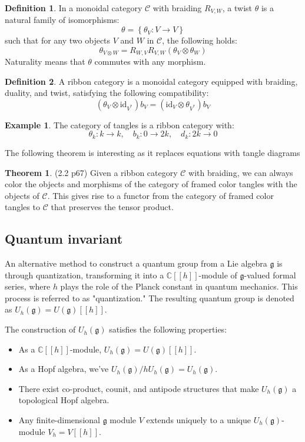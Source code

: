 \documentclass[11pt]{article}
\theoremstyle{definition}
\newtheorem{theo}{Theorem}[section]
\newtheorem{ex}{Example}[section]
\newtheorem{Def}{Definition}[section]
\begin{document}
\begin{Def} In a monoidal category \(\mathcal{C}\) with braiding \(R_{V,W}\), a twist \(\theta\) is a natural family of isomorphisms:
\[\theta=\left\lbrace\theta_V : V\to V \right\rbrace\]
such that for any two objects \(V\) and \(W\) in \(\mathcal{C}\), the following holds:
\[\theta_{V\otimes W}=R_{W,V}R_{V,W}(\theta_V\otimes\theta_W)\]
Naturality means that \(\theta\) commutes with any morphism.
\end{Def}

\begin{Def}
A ribbon category is a monoidal category equipped with braiding, duality, and twist, satisfying the following compatibility:
\[(\theta_V\otimes \text{id}_{V^{*}})b_V=(\text{id}_V\otimes\theta_{V^{*}})b_V\]
\end{Def}

\begin{ex} The category of tangles is a ribbon category with:
\[\theta_k : k\to k, \quad b_k : 0\to 2k, \quad d_k : 2k\to 0\]
\end{ex}

The following theorem is interesting as it replaces equations with tangle diagrams

\begin{theo} \cite{KRP} (2.2 p67) Given a ribbon category \(\mathcal{C}\) with braiding, we can always color the objects and morphisms of the category of framed color tangles with the objects of \(\mathcal{C}\). This gives rise to a functor from the category of framed color tangles to \(\mathcal{C}\) that preserves the tensor product.
\end{theo}

\subsection{\Large \textbf{Quantum invariant}}
An alternative method to construct a quantum group from a Lie algebra \(\mathfrak{g}\) is through quantization, transforming it into a \(\mathbb{C}[[h]]\)-module of \(\mathfrak{g}\)-valued formal series, where \(h\) plays the role of the Planck constant in quantum mechanics. This process is referred to as "quantization." The resulting quantum group is denoted as \(U_h(\mathfrak{g})=U(\mathfrak{g})[[h]]\).

The construction of \(U_h(\mathfrak{g})\) satisfies the following properties:
\begin{itemize}
\item As a \(\mathbb{C}[[h]]\)-module, \(U_h(\mathfrak{g})=U(\mathfrak{g})[[h]]\).
\item As a Hopf algebra, we've \(U_h(\mathfrak{g})/hU_h(\mathfrak{g})=U_h(\mathfrak{g})\).
\item There exist co-product, counit, and antipode structures that make \(U_h(\mathfrak{g})\) a topological Hopf algebra.
\item Any finite-dimensional \(\mathfrak{g}\) module \(V\) extends uniquely to a unique \(U_h(\mathfrak{g})\)-module \(V_h=V[[h]]\).
\end{itemize}
\end{document}
